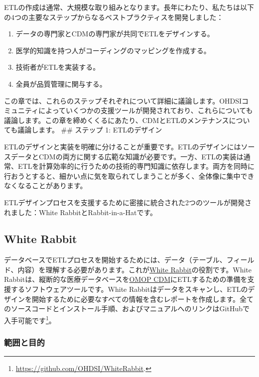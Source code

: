 \documentclass[
  11pt]{book}
\providecommand{\tightlist}{%
  \setlength{\itemsep}{0pt}\setlength{\parskip}{0pt}}
\theoremstyle{definition}
\theoremstyle{definition}
\theoremstyle{definition}
\theoremstyle{definition}
\theoremstyle{remark}
\begin{document}
ETLの作成は通常、大規模な取り組みとなります。長年にわたり、私たちは以下の4つの主要なステップからなるベストプラクティスを開発しました：

\begin{enumerate}
\def\labelenumi{\arabic{enumi}.}
\tightlist
\item
  データの専門家とCDMの専門家が共同でETLをデザインする。
\item
  医学的知識を持つ人がコーディングのマッピングを作成する。
\item
  技術者がETLを実装する。
\item
  全員が品質管理に関与する。
\end{enumerate}

この章では、これらのステップそれぞれについて詳細に議論します。OHDSIコミュニティによっていくつかの支援ツールが開発されており、これらについても議論します。この章を締めくくるにあたり、CDMとETLのメンテナンスについても議論します。
\#\# ステップ 1: ETLのデザイン

ETLのデザインと実装を明確に分けることが重要です。ETLのデザインにはソースデータとCDMの両方に関する広範な知識が必要です。一方、ETLの実装は通常、ETLを計算効率的に行うための技術的専門知識に依存します。両方を同時に行おうとすると、細かい点に気を取られてしまうことが多く、全体像に集中できなくなることがあります。

ETLデザインプロセスを支援するために密接に統合された2つのツールが開発されました：White RabbitとRabbit-in-a-Hatです。

\subsection{White Rabbit}\label{white-rabbit}

データベースでETLプロセスを開始するためには、データ（テーブル、フィールド、内容）を理解する必要があります。これが\href{https://github.com/OHDSI/WhiteRabbit}{White Rabbit}の役割です。White Rabbitは、縦断的な医療データベースを\href{https://github.com/OHDSI/CommonDataModel}{OMOP CDM}にETLするための準備を支援するソフトウェアツールです。White Rabbitはデータをスキャンし、ETLのデザインを開始するために必要なすべての情報を含むレポートを作成します。全てのソースコードとインストール手順、およびマニュアルへのリンクはGitHubで入手可能です\footnote{\url{https://github.com/OHDSI/WhiteRabbit}.}。 

\subsubsection*{範囲と目的}\label{ux7bc4ux56f2ux3068ux76eeux7684}
\end{document}

